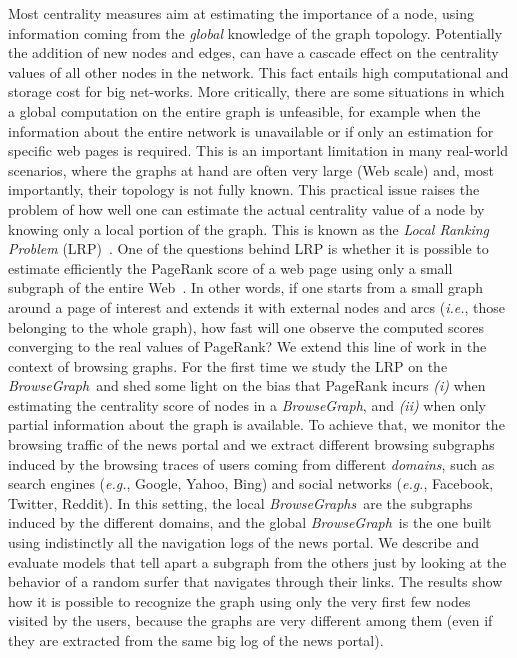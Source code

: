 \documentclass{sig-alternate-2013}
\newcommand{\ie}{\emph{i.e.}}
\newcommand{\eg}{\emph{e.g.}}
\newcommand{\bgraph}{\textit{BrowseGraph}}
\newcommand{\bgraphs}{\textit{BrowseGraphs}}
\begin{document}
Most centrality measures aim at estimating the importance of a node, using information coming from the \textit{global} knowledge of the graph topology. Potentially the addition of new nodes and edges, can have a cascade effect on the centrality values of all other nodes in the network.
This fact entails high computational and storage cost for big net\hyp{}works. More critically, there are some situations in which a global computation on the entire graph is unfeasible, for example when the information about the entire network is unavailable or if only an estimation for specific web pages is required.
This is an important limitation in many real-world scenarios, where the graphs at hand are often very large (Web scale) and, most importantly, their topology is not fully known. This practical issue raises the problem of how well one can estimate the actual centrality value of a node by knowing only a local portion of the graph. This is known as the \textit{Local Ranking Problem} (LRP)~\cite{Chen2004}.
% 
One of the questions behind LRP is whether it is possible to estimate efficiently the PageRank score of a web page using only a small subgraph of the entire Web~\cite{Bressan2011}. In other words, if one starts from a small graph around a page of interest and extends it with external nodes and arcs (\ie, those belonging to the whole graph), how fast will one observe the computed scores converging to the real values of PageRank?
% 
We extend this line of work in the context of browsing graphs. For the first time we study the LRP on the \bgraph\ and shed some light on the bias that PageRank incurs {\it (i)} when estimating the centrality score of nodes in a \bgraph, and {\it (ii)} when only partial information about the graph is available. To achieve that, we monitor the browsing traffic of the news portal and we extract different browsing subgraphs induced by the browsing traces of users coming from different \textit{domains}, such as search engines (\eg, Google, Yahoo, Bing) and social networks (\eg, Facebook, Twitter, Reddit). In this setting, the local \bgraphs\ are the subgraphs induced by the different domains, and the global \bgraph\ is the one built using indistinctly all the navigation logs of the news portal.
We describe and evaluate models that tell apart a subgraph from the others just by looking at the behavior of a random surfer that navigates through their links.
The results show how it is possible to recognize the graph using only the very first few nodes visited by the users, because the graphs are very different among them (even if they are extracted from the same big log of the news portal).
\end{document}
